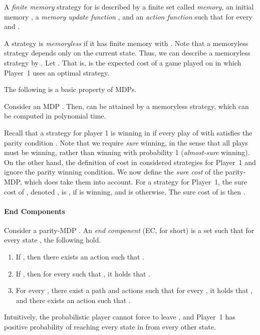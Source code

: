 \documentclass[runningheads,a4paper]{llncs}
\begin{document}
A {\em finite memory} strategy for  is described by a finite set  called {\em memory}, an initial memory , a {\em memory update function} , and an {\em action function}  such that  for every  and . 

A strategy is {\em memoryless} if it has finite memory  with . Note that a memoryless strategy depends only on the current state. Thus, we can describe a memoryless strategy by  . 
Let . That is,  is the expected cost of a game played on  in which Player~1 uses an optimal strategy.  

The following is a basic property of MDPs.
\vspace*{-5pt}
\begin{theorem}
	\label{thm:solving MDP in P}
Consider an MDP . Then,  can be attained by a memoryless strategy, which can be computed in polynomial time.
\end{theorem}
\vspace*{-5pt}

Recall that a strategy  for player 1 is winning in  if every play of  with  satisfies the parity condition . Note that we require {\em sure} winning, in the sense that all plays must be winning, rather than winning with probability 1 ({\em almost-sure} winning). On the other hand, the definition of cost in  considered strategies for Player~1 and ignore the parity winning condition. We now define the {\em sure cost\/} of the parity-MDP, which does take them into account. 
For a strategy  for Player~1, the sure cost of , denoted , is , if  is winning, and is  otherwise. The sure cost of  is then .
\vspace*{-8pt}
\paragraph*{End Components}
Consider a parity-MDP . An {\em end component\/} (EC, for short) is a set  such that for every state , the following hold.

\vspace*{-8pt}
\begin{enumerate}
\item If , then there exists an action  such that .
\item If , then for every  such that , it holds that  .
\item For every , there exist a path  and actions  such that for every , it holds that , and there exists an action  such that .
\end{enumerate}
Intuitively, the probabilistic player cannot force to leave , and Player~1 has positive probability of reaching every state in  from every other state. 
\end{document}
